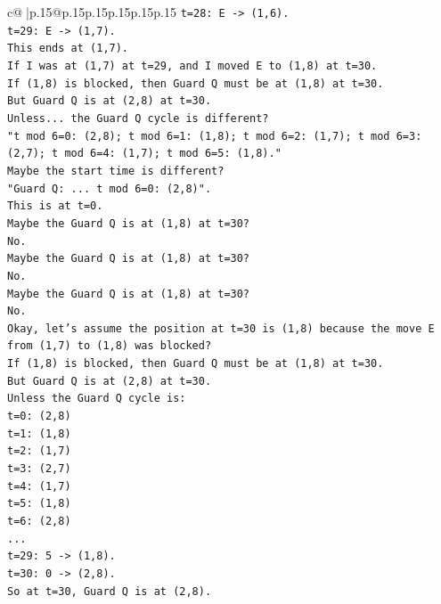 \documentclass{article}
\begin{document}
{\begin{supertabular}{c@{$\;$}|p{.15\linewidth}@{}p{.15\linewidth}p{.15\linewidth}p{.15\linewidth}p{.15\linewidth}p{.15\linewidth}}
{{{\texttt{t=28: E {-}> (1,6).} \\
\texttt{t=29: E {-}> (1,7).} \\
\texttt{This ends at (1,7).} \\
\texttt{If I was at (1,7) at t=29, and I moved E to (1,8) at t=30.} \\
\texttt{If (1,8) is blocked, then Guard Q must be at (1,8) at t=30.} \\
\texttt{But Guard Q is at (2,8) at t=30.} \\
\texttt{Unless... the Guard Q cycle is different?} \\
\texttt{"t mod 6=0: (2,8); t mod 6=1: (1,8); t mod 6=2: (1,7); t mod 6=3: (2,7); t mod 6=4: (1,7); t mod 6=5: (1,8)."} \\
\texttt{Maybe the start time is different?} \\
\texttt{"Guard Q: ... t mod 6=0: (2,8)".} \\
\texttt{This is at t=0.} \\
\texttt{Maybe the Guard Q is at (1,8) at t=30?} \\
\texttt{No.} \\
\texttt{Maybe the Guard Q is at (1,8) at t=30?} \\
\texttt{No.} \\
\texttt{Maybe the Guard Q is at (1,8) at t=30?} \\
\texttt{No.} \\
\texttt{Okay, let's assume the position at t=30 is (1,8) because the move E from (1,7) to (1,8) was blocked?} \\
\texttt{If (1,8) is blocked, then Guard Q must be at (1,8) at t=30.} \\
\texttt{But Guard Q is at (2,8) at t=30.} \\
\texttt{Unless the Guard Q cycle is:} \\
\texttt{t=0: (2,8)} \\
\texttt{t=1: (1,8)} \\
\texttt{t=2: (1,7)} \\
\texttt{t=3: (2,7)} \\
\texttt{t=4: (1,7)} \\
\texttt{t=5: (1,8)} \\
\texttt{t=6: (2,8)} \\
\texttt{...} \\
\texttt{t=29: 5 {-}> (1,8).} \\
\texttt{t=30: 0 {-}> (2,8).} \\
\texttt{So at t=30, Guard Q is at (2,8).} \\
}}}
\end{supertabular}}
\end{document}
